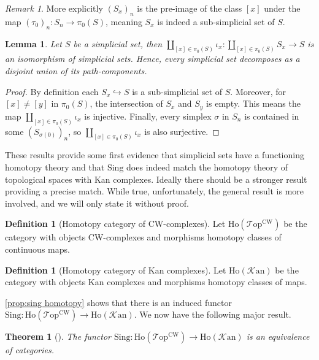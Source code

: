 \documentclass[11pt, a4paper]{amsart}
\newcommand{\Top}{\mathscr{T}\mathrm{op}}
\newcommand{\Sing}{\mathrm{Sing}}
\newcommand{\Kan}{\mathscr{K}\mathrm{an}}
\newcommand{\Ho}{\mathrm{Ho}}
\newtheorem{theorem}[equation]{Theorem}
\newtheorem{lemma}[equation]{Lemma}
\theoremstyle{definition}
\newtheorem{definition}[equation]{Definition}
\theoremstyle{remark}
\newtheorem{remark}[equation]{Remark}
\numberwithin{equation}{section}
\begin{document}
\begin{remark}
  More explicitly $(S_x)_n$ is the pre-image of the class $[x]$ under the map $(\tau_0)_n\colon S_n \to \pi_0(S)$, meaning $S_x$ is indeed a sub-simplicial set of $S$.
\end{remark}

\begin{lemma} \label{lemma:path component decomposition}
 Let $S$ be a simplicial set, then $\coprod_{[x] \in \pi_0(S)}\iota_x \colon \coprod_{[x] \in \pi_0(S)} S_x \to S$ is an isomorphism of simplicial sets. Hence, every simplicial set decomposes as a disjoint union of its path-components.
\end{lemma}

\begin{proof}
 By definition each $S_x \hookrightarrow S$ is a sub-simplicial set of $S$. Moreover, for $[x] \neq [y]$ in $\pi_0(S)$, the intersection of $S_x$ and $S_y$ is empty. This means the map $\coprod_{[x] \in \pi_0(S)}\iota_x$ is injective. Finally, every simplex $\sigma$ in $S_n$ is contained in some $(S_{\sigma(0)})_n$, so $\coprod_{[x] \in \pi_0(S)} \iota_x$ is also surjective. 
\end{proof}

These results provide some first evidence that simplicial sets have a functioning homotopy theory and that $\Sing$ does indeed match the homotopy theory of topological spaces with Kan complexes. Ideally there should be a stronger result providing a precise match. While true, unfortunately, the general result is more involved, and we will only state it without proof. 

\begin{definition}[Homotopy category of CW-complexes]
  Let $\Ho(\Top^{\text{CW}})$ be the category with objects CW-complexes and morphisms homotopy classes of continuous maps.
\end{definition}

\begin{definition}[Homotopy category of Kan complexes]
  Let $\Ho(\Kan)$ be the category with objects Kan complexes and morphisms homotopy classes of maps.
\end{definition}

\cref{prop:sing homotopy} shows that there is an induced functor $\Sing\colon\Ho(\Top^{\text{CW}}) \to \Ho(\Kan)$. We now have the following major result.

\begin{theorem}[{\cite[Theorem 11.4]{goerssjardine2009simplicialhomotopytheory}}] \label{thm:sing equivalence}
 The functor $\Sing\colon \Ho(\Top^{\text{CW}}) \to \Ho(\Kan)$ is an equivalence of categories.
\end{theorem}
\end{document}
